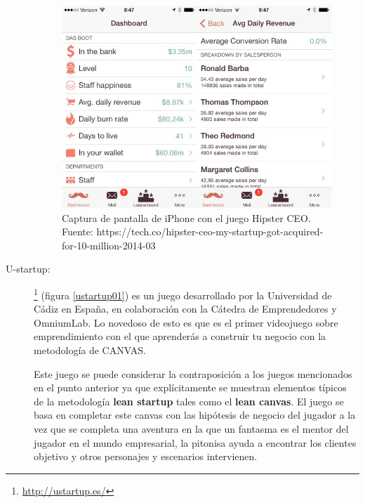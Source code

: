 \begin{description}
\begin{figure}
\begin{center}
\includegraphics[scale=0.6]{imagenes/hipster01.jpg}
\caption{Captura de pantalla de iPhone con el juego Hipster CEO. Fuente: https://tech.co/hipster-ceo-my-startup-got-acquired-for-10-million-2014-03}
\label{hipster01}
\end{center}
\end{figure}

	\item [U-startup:] \footnote{\url{http://ustartup.es/}} (figura \ref{ustartup01}) es un juego desarrollado por la Universidad de Cádiz en España, en colaboración con la Cátedra de Emprendedores y OmniumLab. Lo novedoso de esto es que es el primer videojuego sobre emprendimiento con el que aprenderás a construir tu negocio con la metodología de CANVAS. \cite{danieladelbosque2016}
	
Este juego se puede considerar la contraposición a los juegos mencionados en el punto anterior ya que explícitamente se muestran elementos típicos de la metodología \textbf{lean startup} tales como el \textbf{lean canvas}. El juego se basa en completar este canvas con las hipótesis de negocio del jugador a la vez que se completa una aventura en la que un fantasma es el mentor del jugador en el mundo empresarial, la pitonisa ayuda a encontrar los clientes objetivo y otros personajes y escenarios intervienen.
	

\end{description}
